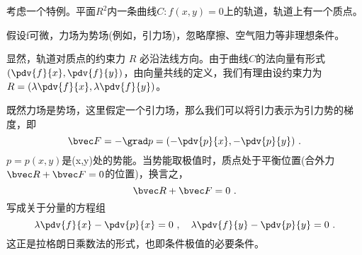 考虑一个特例。平面$R^2$内一条曲线$C:f(x,y)=0$上的轨道，轨道上有一个质点。

假设f可微，力场为势场(例如，引力场)，忽略摩擦、空气阻力等非理想条件。

显然，轨道对质点的约束力 $R$ 必沿法线方向。由于曲线$C$的法向量有形式$(\pdv{f}{x},\pdv{f}{y})$，由向量共线的定义，我们有理由设约束力为$R
=(\lambda\pdv{f}{x},\lambda\pdv{f}{y})$。

既然力场是势场，这里假定一个引力场，那么我们可以将引力表示为引力势的梯度，即
\begin{equation}
\bvec F =-\grad p = (-\pdv{p}{x},-\pdv{p}{y})~.
\end{equation}
$p=p(x,y)$是(x,y)处的势能。当势能取极值时，质点处于平衡位置(合外力$\bvec R+\bvec F=0$的位置)，换言之，
\begin{equation}
\bvec R + \bvec F = 0 ~.
\end{equation}
写成关于分量的方程组
\begin{equation}
\lambda\pdv{f}{x}  -\pdv{p}{x} = 0~, \quad
\lambda\pdv{f}{y}  -\pdv{p}{y} = 0 ~.
\end{equation}
这正是拉格朗日乘数法的形式，也即条件极值的必要条件。
